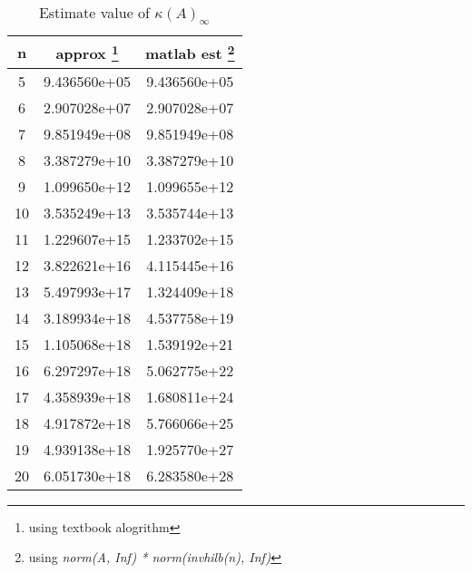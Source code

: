 \documentclass[11pt]{article}
\begin{document}
\begin{table}[htpb]
	\centering
	\begin{tabular}{ccc}
		\hline
		n  & approx \footnote{using textbook alogrithm} & matlab est \footnote{using \em{norm(A, Inf) * norm(invhilb(n), Inf)}}   \\
		\hline
		5  & 9.436560e+05 & 9.436560e+05 \\
		6  & 2.907028e+07 & 2.907028e+07 \\
		7  & 9.851949e+08 & 9.851949e+08 \\
		8  & 3.387279e+10 & 3.387279e+10 \\
		9  & 1.099650e+12 & 1.099655e+12 \\
		10 & 3.535249e+13 & 3.535744e+13 \\
		11 & 1.229607e+15 & 1.233702e+15 \\
		12 & 3.822621e+16 & 4.115445e+16 \\
		13 & 5.497993e+17 & 1.324409e+18 \\
		14 & 3.189934e+18 & 4.537758e+19 \\
		15 & 1.105068e+18 & 1.539192e+21 \\
		16 & 6.297297e+18 & 5.062775e+22 \\
		17 & 4.358939e+18 & 1.680811e+24 \\
		18 & 4.917872e+18 & 5.766066e+25 \\
		19 & 4.939138e+18 & 1.925770e+27 \\
		20 & 6.051730e+18 & 6.283580e+28 \\
		\hline
	\end{tabular}
	\caption{Estimate value of $\kappa(A)_{\infty}$}
	\label{tab:condition-number-of-hilb}
\end{table}
\end{document}
